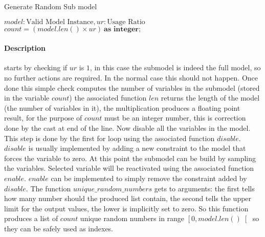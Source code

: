 \begin{algorithm}[H]
    \caption[Generate Random Sub model]{Generate Random Sub model\footnotemark}\label{algo:submodel-build}
    
    \begin{algorithmic}[1]
        \REQUIRE $model : \text{Valid Model Instance}, ur : \text{Usage Ratio}$
            \RETURN
        \ENDIF
        \STATE $count = (model.len() \times ur)\ \textbf{as integer};$
            
        \ENDFOR
        \ENDFOR
    \end{algorithmic}
\end{algorithm}



\paragraph*{Description}
     starts by checking if $ur$ is $1$, in this case the submodel is indeed the full model,
    so no further actions are required. In the normal case this should not 
    happen. Once done this simple check  computes the number of
    variables in the submodel (stored in the variable $count$)  the associated function 
    $len$ returns the length of the model (the number of variables in it), the multiplication produces a floating point result, for the purpose of 
    $count$ must be an integer number, this is correction done by the cast at end of the line. Now  disable all the variables in the model. This step is
    done by the first for loop using the associated function $disable$. $disable$ is usually implemented by adding a new constraint to the model that
    forces the variable to zero. At this point the submodel can be build by sampling the variables. Selected variable will be reactivated using the associated function
    $enable$. $enable$ can be implemented to simply remove the constraint added by $disable$.
    The function $unique\_random\_numbers$ gets to arguments: the first tells how many number should the produced list contain, the second tells the upper limit for the output values,
    the lower is implicitly set to zero. So this function produces a list of $count$ unique random numbers in range $\left[0, model.len()\right[$ so they can be safely used as indexes. 

